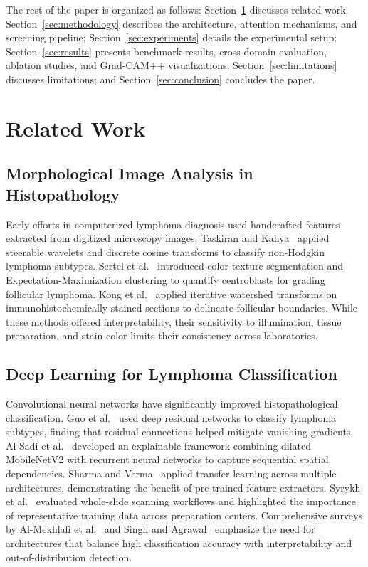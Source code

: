 \documentclass[conference]{IEEEtran}
\begin{document}
The rest of the paper is organized as follows: Section~\ref{sec:related} discusses related work; Section~\ref{sec:methodology} describes the architecture, attention mechanisms, and screening pipeline; Section~\ref{sec:experiments} details the experimental setup; Section~\ref{sec:results} presents benchmark results, cross-domain evaluation, ablation studies, and Grad-CAM++ visualizations; Section~\ref{sec:limitations} discusses limitations; and Section~\ref{sec:conclusion} concludes the paper.

\section{Related Work}
\label{sec:related}

\subsection{Morphological Image Analysis in Histopathology}
Early efforts in computerized lymphoma diagnosis used handcrafted features extracted from digitized microscopy images. Taskiran and Kahya~\cite{taskiran2010automatic} applied steerable wavelets and discrete cosine transforms to classify non-Hodgkin lymphoma subtypes. Sertel et al.~\cite{sertel2010computer, sertel2012multi, sertel2013detection} introduced color-texture segmentation and Expectation-Maximization clustering to quantify centroblasts for grading follicular lymphoma. Kong et al.~\cite{kong2010detection} applied iterative watershed transforms on immunohistochemically stained sections to delineate follicular boundaries. While these methods offered interpretability, their sensitivity to illumination, tissue preparation, and stain color limits their consistency across laboratories.

\subsection{Deep Learning for Lymphoma Classification}
Convolutional neural networks have significantly improved histopathological classification. Guo et al.~\cite{guo2021research} used deep residual networks to classify lymphoma subtypes, finding that residual connections helped mitigate vanishing gradients. Al-Sadi et al.~\cite{alsadi2023enhanced} developed an explainable framework combining dilated MobileNetV2 with recurrent neural networks to capture sequential spatial dependencies. Sharma and Verma~\cite{sharma2025enhancing} applied transfer learning across multiple architectures, demonstrating the benefit of pre-trained feature extractors. Syrykh et al.~\cite{syrykh2020automated} evaluated whole-slide scanning workflows and highlighted the importance of representative training data across preparation centers. Comprehensive surveys by Al-Mekhlafi et al.~\cite{almekhlafi2023comprehensive} and Singh and Agrawal~\cite{singh2023enhanced} emphasize the need for architectures that balance high classification accuracy with interpretability and out-of-distribution detection.
\end{document}
